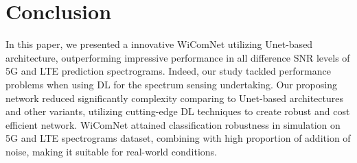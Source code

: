 \documentclass[journal]{IEEEtran} %
\begin{document}
\section{Conclusion}
In this paper, we presented a innovative WiComNet utilizing Unet-based architecture, outperforming impressive performance in all difference SNR levels of 5G and LTE prediction spectrograms. Indeed, our study tackled performance problems when using DL for the spectrum sensing undertaking. Our proposing network reduced significantly complexity comparing to Unet-based architectures and other variants, utilizing cutting-edge DL techniques to create robust and cost efficient network. WiComNet attained classification robustness in simulation on 5G and LTE spectrograms dataset, combining with high proportion of addition of noise, making it suitable for real-world conditions. 





\end{document}
